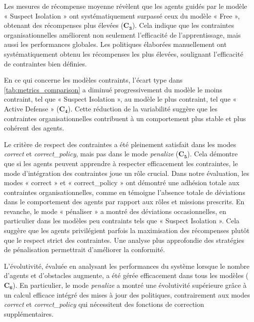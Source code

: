 Les mesures de récompense moyenne révèlent que les agents guidés par le modèle « Suspect Isolation » ont systématiquement surpassé ceux du modèle « Free », obtenant des récompenses plus élevées ($\mathbf{C_3}$). Cela indique que les contraintes organisationnelles améliorent non seulement l'efficacité de l'apprentissage, mais aussi les performances globales. Les politiques élaborées manuellement ont systématiquement obtenu les récompenses les plus élevées, soulignant l'efficacité de contraintes bien définies.

En ce qui concerne les modèles contraints, l'écart type dans \autoref{tab:metrics_comparison} a diminué progressivement du modèle le moins contraint, tel que « Suspect Isolation », au modèle le plus contraint, tel que « Active Defense » ($\mathbf{C_4}$). Cette réduction de la variabilité suggère que les contraintes organisationnelles contribuent à un comportement plus stable et plus cohérent des agents.

Le critère de respect des contraintes a été pleinement satisfait dans les modes \textit{correct} et \textit{correct\_policy}, mais pas dans le mode \textit{penalize} ($\mathbf{C_5}$). Cela démontre que si les agents peuvent apprendre à respecter efficacement les contraintes, le mode d'intégration des contraintes joue un rôle crucial. Dans notre évaluation, les modes « correct » et « correct\_policy » ont démontré une adhésion totale aux contraintes organisationnelles, comme en témoigne l'absence totale de déviations dans le comportement des agents par rapport aux rôles et missions prescrits. En revanche, le mode « pénaliser » a montré des déviations occasionnelles, en particulier dans les modèles peu contraints tels que « Suspect Isolation ». Cela suggère que les agents privilégient parfois la maximisation des récompenses plutôt que le respect strict des contraintes. Une analyse plus approfondie des stratégies de pénalisation permettrait d'améliorer la conformité.

L'évolutivité, évaluée en analysant les performances du système lorsque le nombre d'agents et d'obstacles augmente, a été gérée efficacement dans tous les modèles ($\mathbf{C_6}$). En particulier, le mode \textit{penalize} a montré une évolutivité supérieure grâce à un calcul efficace intégré des mises à jour des politiques, contrairement aux modes \textit{correct} et \textit{correct\_policy} qui nécessitent des fonctions de correction supplémentaires.

